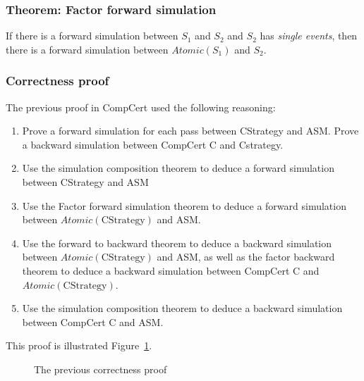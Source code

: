 \subsubsection{Theorem: Factor forward simulation} If there is a forward simulation between $S_1$ and $S_2$ and $S_2$ has \textit{single events}, then there is a forward simulation between $\mathit{Atomic}(S_1)$ and $S_2$.

\subsubsection{Correctness proof}
The previous proof in CompCert used the following reasoning:
\begin{enumerate}
\item Prove a forward simulation for each pass between CStrategy and ASM. Prove a backward simulation between CompCert C and Cstrategy.
\item Use the simulation composition theorem to deduce a forward simulation between CStrategy and ASM
\item Use the Factor forward simulation theorem to deduce a forward simulation between $\mathit{Atomic}(\text{CStrategy})$ and ASM.
\item Use the forward to backward theorem to deduce a backward simulation between $\mathit{Atomic}(\text{CStrategy})$ and ASM, as well as the factor backward theorem to deduce a backward simulation between CompCert C and $\mathit{Atomic}(\text{CStrategy})$.
\item Use the simulation composition theorem to deduce a backward simulation between CompCert C and ASM.
\end{enumerate}

This proof is illustrated Figure~\ref{fig:oldproof}.

\begin{figure}
  \makebox[\textwidth][c]{\oldproof}
  \caption{The previous correctness proof}
  \label{fig:oldproof}
\end{figure}
